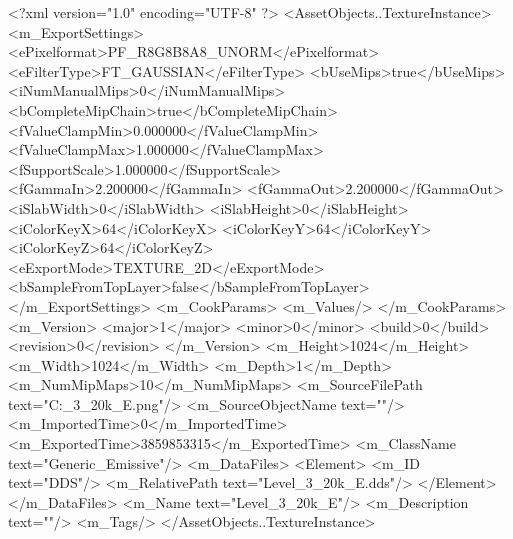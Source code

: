 <?xml version="1.0" encoding="UTF-8" ?>
<AssetObjects..TextureInstance>
	<m_ExportSettings>
		<ePixelformat>PF_R8G8B8A8_UNORM</ePixelformat>
		<eFilterType>FT_GAUSSIAN</eFilterType>
		<bUseMips>true</bUseMips>
		<iNumManualMips>0</iNumManualMips>
		<bCompleteMipChain>true</bCompleteMipChain>
		<fValueClampMin>0.000000</fValueClampMin>
		<fValueClampMax>1.000000</fValueClampMax>
		<fSupportScale>1.000000</fSupportScale>
		<fGammaIn>2.200000</fGammaIn>
		<fGammaOut>2.200000</fGammaOut>
		<iSlabWidth>0</iSlabWidth>
		<iSlabHeight>0</iSlabHeight>
		<iColorKeyX>64</iColorKeyX>
		<iColorKeyY>64</iColorKeyY>
		<iColorKeyZ>64</iColorKeyZ>
		<eExportMode>TEXTURE_2D</eExportMode>
		<bSampleFromTopLayer>false</bSampleFromTopLayer>
	</m_ExportSettings>
	<m_CookParams>
		<m_Values/>
	</m_CookParams>
	<m_Version>
		<major>1</major>
		<minor>0</minor>
		<build>0</build>
		<revision>0</revision>
	</m_Version>
	<m_Height>1024</m_Height>
	<m_Width>1024</m_Width>
	<m_Depth>1</m_Depth>
	<m_NumMipMaps>10</m_NumMipMaps>
	<m_SourceFilePath text="C:\Users\Shadow\Desktop\Prototypes\Level_3_20k_E.png"/>
	<m_SourceObjectName text=""/>
	<m_ImportedTime>0</m_ImportedTime>
	<m_ExportedTime>3859853315</m_ExportedTime>
	<m_ClassName text="Generic_Emissive"/>
	<m_DataFiles>
		<Element>
			<m_ID text="DDS"/>
			<m_RelativePath text="Level_3_20k_E.dds"/>
		</Element>
	</m_DataFiles>
	<m_Name text="Level_3_20k_E"/>
	<m_Description text=""/>
	<m_Tags/>
</AssetObjects..TextureInstance>

